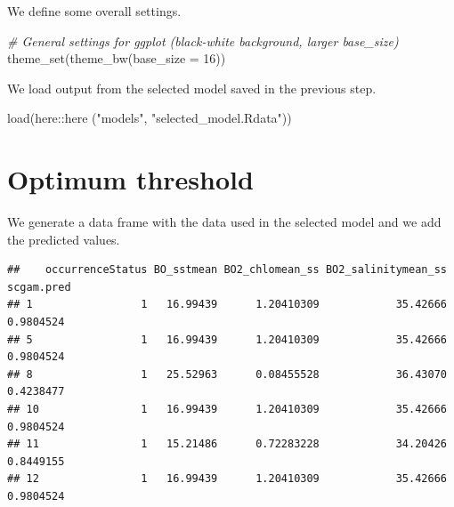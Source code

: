 \documentclass[
]{book}
\newenvironment{Shaded}{\begin{snugshade}}{\end{snugshade}}
\newcommand{\AttributeTok}[1]{\textcolor[rgb]{0.77,0.63,0.00}{#1}}
\newcommand{\CommentTok}[1]{\textcolor[rgb]{0.56,0.35,0.01}{\textit{#1}}}
\newcommand{\DecValTok}[1]{\textcolor[rgb]{0.00,0.00,0.81}{#1}}
\newcommand{\FunctionTok}[1]{\textcolor[rgb]{0.00,0.00,0.00}{#1}}
\newcommand{\NormalTok}[1]{#1}
\newcommand{\OtherTok}[1]{\textcolor[rgb]{0.56,0.35,0.01}{#1}}
\newcommand{\SpecialCharTok}[1]{\textcolor[rgb]{0.00,0.00,0.00}{#1}}
\newcommand{\StringTok}[1]{\textcolor[rgb]{0.31,0.60,0.02}{#1}}
\begin{document}
We define some overall settings.

\begin{Shaded}
\begin{Highlighting}[]
\CommentTok{\# General settings for ggplot (black{-}white background, larger base\_size)}
\FunctionTok{theme\_set}\NormalTok{(}\FunctionTok{theme\_bw}\NormalTok{(}\AttributeTok{base\_size =} \DecValTok{16}\NormalTok{))}
\end{Highlighting}
\end{Shaded}

We load output from the selected model saved in the previous step.

\begin{Shaded}
\begin{Highlighting}[]
\FunctionTok{load}\NormalTok{(here}\SpecialCharTok{::}\FunctionTok{here}\NormalTok{ (}\StringTok{"models"}\NormalTok{, }\StringTok{"selected\_model.Rdata"}\NormalTok{))}
\end{Highlighting}
\end{Shaded}

\hypertarget{optimum-threshold}{%
\section{Optimum threshold}\label{optimum-threshold}}

We generate a data frame with the data used in the selected model and we add the predicted values.

\begin{Shaded}
\end{Shaded}

\begin{verbatim}
##    occurrenceStatus BO_sstmean BO2_chlomean_ss BO2_salinitymean_ss scgam.pred
## 1                 1   16.99439      1.20410309            35.42666  0.9804524
## 5                 1   16.99439      1.20410309            35.42666  0.9804524
## 8                 1   25.52963      0.08455528            36.43070  0.4238477
## 10                1   16.99439      1.20410309            35.42666  0.9804524
## 11                1   15.21486      0.72283228            34.20426  0.8449155
## 12                1   16.99439      1.20410309            35.42666  0.9804524
\end{verbatim}
\end{document}
